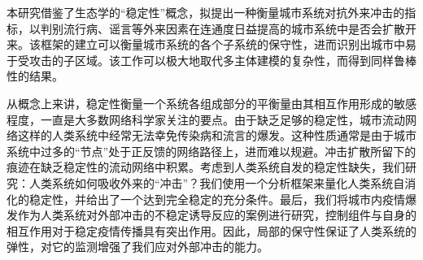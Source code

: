 本研究借鉴了生态学的“稳定性”概念\cite{may1972will}，拟提出一种衡量城市系统对抗外来冲击的指标，以判别流行病、谣言等外来因素在连通度日益提高的城市系统中是否会扩散开来。该框架的建立可以衡量城市系统的各个子系统的保守性，进而识别出城市中易于受攻击的子区域。该工作可以极大地取代多主体建模的复杂性，而得到同样鲁棒性的结果。

从概念上来讲，稳定性衡量一个系统各组成部分的平衡量由其相互作用形成的敏感程度，一直是大多数网络科学家关注的要点。由于缺乏足够的稳定性，城市流动网络这样的人类系统中经常无法幸免传染病和流言的爆发。这种性质通常是由于城市系统中过多的“节点”处于正反馈的网络路径上，进而难以规避。冲击扩散所留下的痕迹在缺乏稳定性的流动网络中积累。考虑到人类系统自发的稳定性缺失，我们研究：人类系统如何吸收外来的“冲击”？我们使用一个分析框架来量化人类系统自消化的稳定性，并给出了一个达到完全稳定的充分条件。最后，我们将城市内疫情爆发作为人类系统对外部冲击的不稳定诱导反应的案例进行研究，控制组件与自身的相互作用对于稳定疫情传播具有突出作用。因此，局部的保守性保证了人类系统的弹性，对它的监测增强了我们应对外部冲击的能力。

